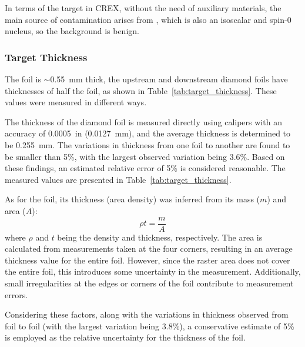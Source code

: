 In terms of the \Ca target in CREX, without the need of auxiliary materials,
the main source of contamination arises from \ca, which is also an isoscalar
and spin-0 nucleus, so the background is benign.

\subsubsection{Target Thickness}
The \Pb foil is $\sim$0.55~mm thick, the upstream and downstream diamond foils 
have thicknesses of half the \Pb foil, as shown in Table~\ref{tab:target_thickness}.
These values were measured in different ways.

The thickness of the diamond foil is measured directly using calipers with an 
accuracy of 0.0005~in (0.0127~mm), and the average thickness is determined to 
be 0.255~mm. The variations in thickness from one foil to another are
found to be smaller than 5\%, with the largest observed variation being 3.6\%. 
Based on these findings, an estimated relative error of 5\% is considered reasonable. 
The measured values are presented in Table~\ref{tab:target_thickness}.

As for the \Pb foil, its thickness (area density) was inferred from its mass ($m$)
and area ($A$):
\begin{equation}
    \rho t = \frac{m}{A}
\end{equation}
where $\rho$ and $t$ being the density and thickness, respectively.
The area is calculated from measurements taken at the four corners, resulting in an average thickness value for the entire foil. However, since the raster area does not cover the entire foil, this introduces some uncertainty in the measurement. Additionally, small irregularities at the edges or corners of the foil contribute to measurement errors.

Considering these factors, along with the variations in thickness observed from foil to foil (with the largest variation being 3.8\%), a conservative estimate of 5\% is employed as the relative uncertainty for the thickness of the \Pb foil.

